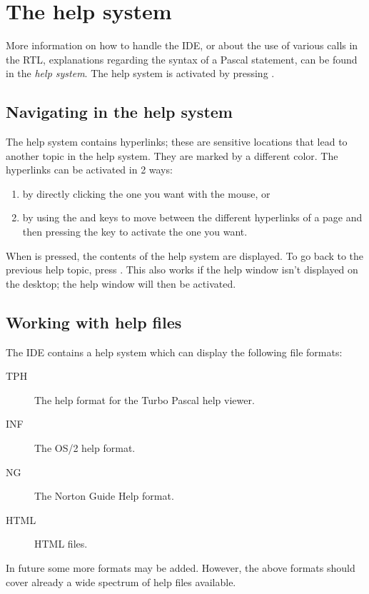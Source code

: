 \section{The help system}

More information on how to handle the IDE, or about the use of various
calls in the RTL, explanations regarding the syntax of a Pascal statement,
can be found in the \emph{help system}. The help system is activated
by pressing .

\subsection{Navigating in the help system}
The help system contains hyperlinks; these are sensitive locations that
lead to another topic in the help system. They are marked by a different
color. The hyperlinks can be activated in 2 ways:
\begin{enumerate}
\item by directly clicking the one you want with the mouse, or
\item by using the  and  keys to move between
the different hyperlinks of a page and then pressing the  
key to activate the one you want.
\end{enumerate}

When  is pressed, the contents of the help system are
displayed. To go back to the previous help topic, press .
This also works if the help window isn't displayed on the desktop; the help
window will then be activated.

%
%
\subsection{Working with help files}
The IDE contains a help system which can display the following file formats:
\begin{description}
\item[TPH] The help format for the Turbo Pascal help viewer.
\item[INF] The OS/2 help format.
\item[NG] The Norton Guide Help format.
\item[HTML] HTML files.
\end{description}
In future some more formats may be added. However, the above formats should
cover already a wide spectrum of help files available.

